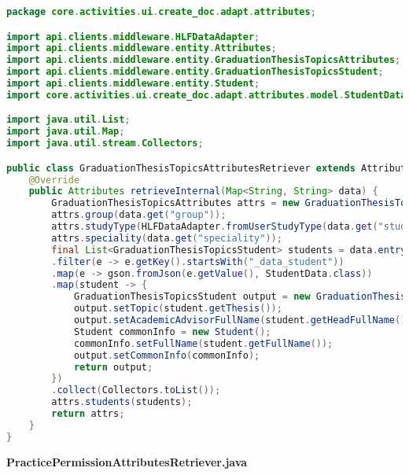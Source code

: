 \begin{lstlisting}[language=Java]
package core.activities.ui.create_doc.adapt.attributes;

import api.clients.middleware.HLFDataAdapter;
import api.clients.middleware.entity.Attributes;
import api.clients.middleware.entity.GraduationThesisTopicsAttributes;
import api.clients.middleware.entity.GraduationThesisTopicsStudent;
import api.clients.middleware.entity.Student;
import core.activities.ui.create_doc.adapt.attributes.model.StudentData;

import java.util.List;
import java.util.Map;
import java.util.stream.Collectors;

public class GraduationThesisTopicsAttributesRetriever extends AttributesRetriever {
	@Override
	public Attributes retrieveInternal(Map<String, String> data) {
		GraduationThesisTopicsAttributes attrs = new GraduationThesisTopicsAttributes();
		attrs.group(data.get("group"));
		attrs.studyType(HLFDataAdapter.fromUserStudyType(data.get("study_type")));
		attrs.speciality(data.get("speciality"));
		final List<GraduationThesisTopicsStudent> students = data.entrySet().stream()
		.filter(e -> e.getKey().startsWith("_data_student"))
		.map(e -> gson.fromJson(e.getValue(), StudentData.class))
		.map(student -> {
			GraduationThesisTopicsStudent output = new GraduationThesisTopicsStudent();
			output.setTopic(student.getThesis());
			output.setAcademicAdvisorFullName(student.getHeadFullName());
			Student commonInfo = new Student();
			commonInfo.setFullName(student.getFullName());
			output.setCommonInfo(commonInfo);
			return output;
		})
		.collect(Collectors.toList());
		attrs.students(students);
		return attrs;
	}
}

\end{lstlisting}
\textbf{PracticePermissionAttributesRetriever.java}
